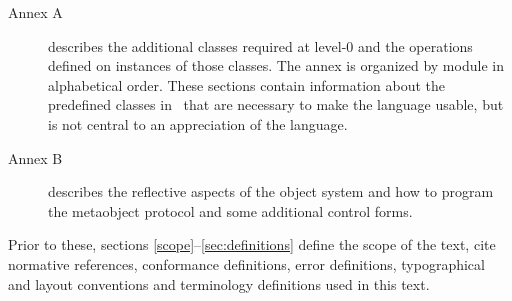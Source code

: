 \begin{optDefinition}
\begin{description}
    \item[Annex A] describes the additional classes required at level-0 and the
    operations defined on instances of those classes.  The annex is organized by module in alphabetical order.
    These sections contain information about the predefined classes in \eulisp\
    that are necessary to make the language usable, but is not central to an
    appreciation of the language.
    \item[Annex B] describes the reflective aspects of the object system and how
    to program the metaobject protocol and some additional control forms.
\end{description}
%
Prior to these, sections \ref{scope}--\ref{sec:definitions} define the scope of
the text, cite normative references, conformance definitions, error definitions,
typographical and layout conventions and terminology definitions used in this
text.
\end{optDefinition}
%
\label{scope}
